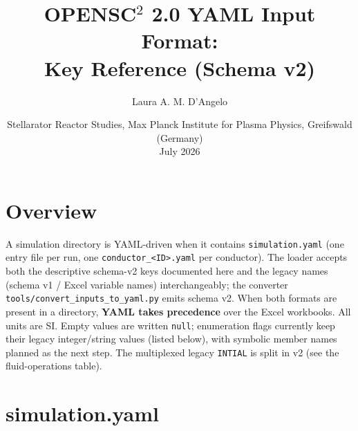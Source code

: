 \documentclass[10pt,a4paper]{article}
\title{OPENSC$^2$ 2.0 YAML Input Format:\\Key Reference (Schema v2)}
\author{Laura A. M. D'Angelo}
\date{%
	{\small Stellarator Reactor Studies, Max Planck Institute for Plasma Physics, Greifswald (Germany)}\\[2ex]%
	July 2026}
\newcommand{\code}[1]{\texttt{#1}}
\begin{document}
\maketitle

\section*{Overview}
A simulation directory is YAML-driven when it contains \code{simulation.yaml}
(one entry file per run, one \code{conductor\_<ID>.yaml} per conductor). The
loader accepts both the descriptive schema-v2 keys documented here and the
legacy names (schema v1 / Excel variable names) interchangeably; the converter
\code{tools/convert\_inputs\_to\_yaml.py} emits schema v2. When both formats
are present in a directory, \textbf{YAML takes precedence} over the Excel
workbooks. All units are SI. Empty values are written \code{null}; enumeration
flags currently keep their legacy integer/string values (listed below), with
symbolic member names planned as the next step. The multiplexed legacy
\code{INTIAL} is split in v2 (see the fluid-operations table).

\section*{simulation.yaml}
\end{document}
